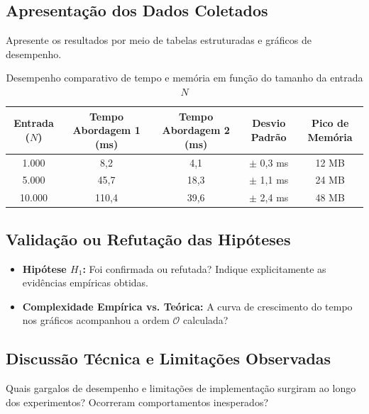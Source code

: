 \documentclass[11pt,a4paper]{article}
\begin{document}
\subsection{Apresentação dos Dados Coletados}
Apresente os resultados por meio de tabelas estruturadas e gráficos de desempenho.

\begin{table}[ht]
\centering
\caption{Desempenho comparativo de tempo e memória em função do tamanho da entrada $N$}
\label{tab:experimentos}
\begin{tabular}{@{}ccccc@{}}
\toprule
\textbf{Entrada ($N$)} & \textbf{Tempo Abordagem 1 (ms)} & \textbf{Tempo Abordagem 2 (ms)} & \textbf{Desvio Padrão} & \textbf{Pico de Memória} \\ \midrule
1.000                  & 8,2                             & 4,1                             & $\pm$ 0,3 ms           & 12 MB                    \\
5.000                  & 45,7                            & 18,3                            & $\pm$ 1,1 ms           & 24 MB                    \\
10.000                 & 110,4                           & 39,6                            & $\pm$ 2,4 ms           & 48 MB                    \\ \bottomrule
\end{tabular}
\end{table}

\subsection{Validação ou Refutação das Hipóteses}
\begin{itemize}
    \item \textbf{Hipótese $H_1$:} Foi confirmada ou refutada? Indique explicitamente as evidências empíricas obtidas.
    \item \textbf{Complexidade Empírica vs. Teórica:} A curva de crescimento do tempo nos gráficos acompanhou a ordem $\mathcal{O}$ calculada?
\end{itemize}

\subsection{Discussão Técnica e Limitações Observadas}
Quais gargalos de desempenho e limitações de implementação surgiram ao longo dos experimentos? Ocorreram comportamentos inesperados?

\end{document}
